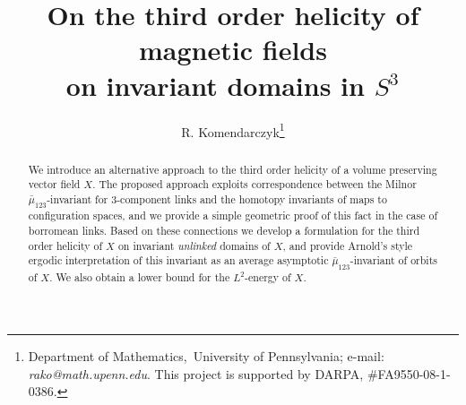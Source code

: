 \documentclass[12pt]{article}
\title{On the third order helicity of magnetic fields\\ on invariant domains in $S^3$}
\author{R. Komendarczyk\footnote{Department of Mathematics,\ University of Pennsylvania; e-mail: \emph{rako@math.upenn.edu}.
 This project is supported  by DARPA, \#FA9550-08-1-0386.
}}
\newcommand{\no}{\noindent}
\begin{document}
\maketitle

\begin{abstract}
 \no We introduce an alternative approach to the third order helicity of a volume preserving vector field $X$. The proposed approach exploits correspondence between the Milnor $\bar{\mu}_{123}$-invariant for 3-component links and the homotopy invariants of maps to configuration spaces, and we provide a simple geometric proof of this fact in the case of borromean links. 
 Based on these connections we develop a formulation for the third order helicity of $X$ on invariant \emph{unlinked} domains of $X$, and 
 provide Arnold's style ergodic interpretation of this invariant
 as an average asymptotic $\bar{\mu}_{123}$-invariant of orbits of $X$. 
 We also obtain a lower bound for the $L^2$-energy of $X$.
\end{abstract} 
\end{document}
